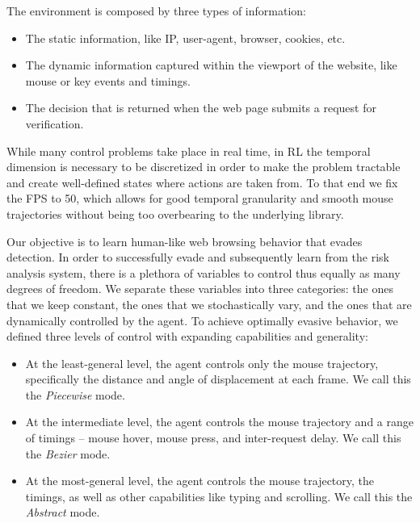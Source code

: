 The environment is composed by three types of information:
\begin{itemize}
  \item The static information, like IP, user-agent, browser, cookies, etc.
  \item The dynamic information captured within the viewport of the website, like mouse or key events and timings.
  \item The decision that is returned when the web page submits a request for verification.
 \end{itemize}

While many control problems take place in real time, in \gls{RL} the temporal dimension is necessary to be discretized in order to make the problem tractable and create well-defined states where actions are taken from.
To that end we fix the \gls{FPS} to 50, which allows for good temporal granularity and smooth mouse trajectories without being too overbearing to the underlying library.


Our objective is to learn human-like web browsing behavior that evades detection.
In order to successfully evade and subsequently learn from the risk analysis system, there is a plethora of variables to control thus equally as many degrees of freedom.
We separate these variables into three categories: the ones that we keep constant, the ones that we stochastically vary, and the ones that are dynamically controlled by the agent.
To achieve optimally evasive behavior, we defined three levels of control with expanding capabilities and generality:

\begin{itemize}
  \item At the least-general level, the agent controls only the mouse trajectory, specifically the distance and angle of displacement at each frame. We call this the \emph{Piecewise} mode.
  \item At the intermediate level, the agent controls the mouse trajectory and a range of timings -- mouse hover, mouse press, and inter-request delay. We call this the \emph{Bezier} mode.
  \item At the most-general level, the agent controls the mouse trajectory, the timings, as well as other capabilities like typing and scrolling. We call this the \emph{Abstract} mode.
 \end{itemize}

